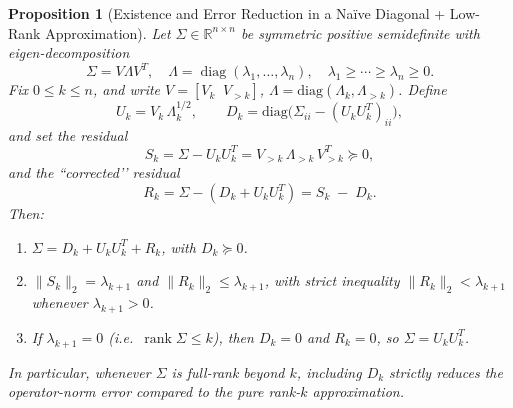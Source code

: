 \documentclass[10pt,a4paper]{amsart}
\newtheorem{proposition}{Proposition}
\providecommand{\R}{\mathbb{R}}
\providecommand{\diag}{\mathrm{diag}}
\DeclareMathOperator{\rank}{rank}
\begin{document}
\begin{proposition}[Existence and Error Reduction in a Na\"ive Diagonal + Low-Rank Approximation] \label{prop:naivedecomposition}
Let \(\Sigma\in\R^{n\times n}\) be symmetric positive semidefinite with eigen-decomposition
\[
  \Sigma = V\Lambda V^T,\quad
  \Lambda=\operatorname{diag}(\lambda_1,\dots,\lambda_n),\quad
  \lambda_1\ge\cdots\ge\lambda_n\ge0.
\]
Fix \(0\le k\le n\), and write \(V=[V_k\;\;V_{>k}]\), \(\Lambda=\mathrm{diag}(\Lambda_k,\Lambda_{>k})\).  Define
\[
  U_k = V_k\,\Lambda_k^{1/2}, 
  \qquad
  D_k = \diag\!\bigl(\Sigma_{ii}-(U_kU_k^T)_{ii}\bigr),
\]
and set the residual
\[
  S_k = \Sigma - U_kU_k^T
  = V_{>k}\,\Lambda_{>k}\,V_{>k}^T \succeq 0,
\]
and the “corrected’’ residual
\[
  R_k = \Sigma - (D_k + U_kU_k^T)
  = S_k \;-\;D_k.
\]
Then:
\begin{enumerate}
  \item \(\Sigma = D_k + U_kU_k^T + R_k\), with \(D_k\succeq0\).
  \item \(\|S_k\|_2 = \lambda_{k+1}\) and
  \(\|R_k\|_2 \le \lambda_{k+1}\), with strict inequality
  \(\|R_k\|_2<\lambda_{k+1}\) whenever \(\lambda_{k+1}>0\).  
  \item If \(\lambda_{k+1}=0\) (i.e.\ \(\rank\Sigma\le k\)), then \(D_k=0\) and \(R_k=0\), so \(\Sigma=U_kU_k^T\).
\end{enumerate}
In particular, whenever \(\Sigma\) is full-rank beyond \(k\), including \(D_k\) strictly reduces the operator-norm error compared to the pure rank-\(k\) approximation.
\end{proposition}
\end{document}

